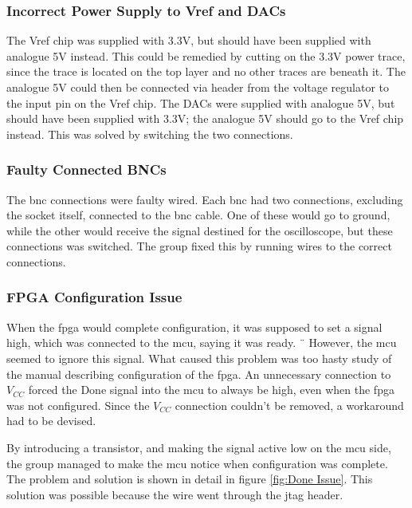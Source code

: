\subsubsection{Incorrect Power Supply to Vref and DACs}
The Vref chip was supplied with 3.3V, but should have been supplied with analogue 5V instead.
This could be remedied by cutting on the 3.3V power trace, since the trace is located on the top layer and no other traces are beneath it.
The analogue 5V could then be connected via header from the voltage regulator to the input pin on the Vref chip.
\newline
The DACs were supplied with analogue 5V, but should have been supplied with 3.3V; the analogue 5V should go to the Vref chip instead.
This was solved by switching the two connections.

\subsubsection{Faulty Connected BNCs}
The \gls{bnc} connections were faulty wired.
Each \gls{bnc} had two connections, excluding the socket itself, connected to the \gls{bnc} cable.
One of these would go to ground, while the other would receive the signal destined for the oscilloscope, but these connections was switched.
The group fixed this by running wires to the correct connections.

\subsubsection{FPGA Configuration Issue}
When the \gls{fpga} would complete configuration, it was supposed to set a signal high, which was connected to the \gls{mcu}, saying it was ready. ¨
However, the \gls{mcu} seemed to ignore this signal.
What caused this problem was too hasty study of the manual describing configuration of the \gls{fpga}.
An unnecessary connection to \(V_{CC}\) forced the Done signal into the \gls{mcu} to always be high, even when the \gls{fpga} was not configured.
Since the \(V_{CC}\) connection couldn't be removed, a workaround had to be devised.

By introducing a transistor, and making the signal active low on the \gls{mcu} side, the group managed to make the \gls{mcu} notice when configuration was complete.
The problem and solution is shown in detail in figure \ref{fig:Done Issue}.
This solution was possible because the wire went through the \gls{jtag} header.

